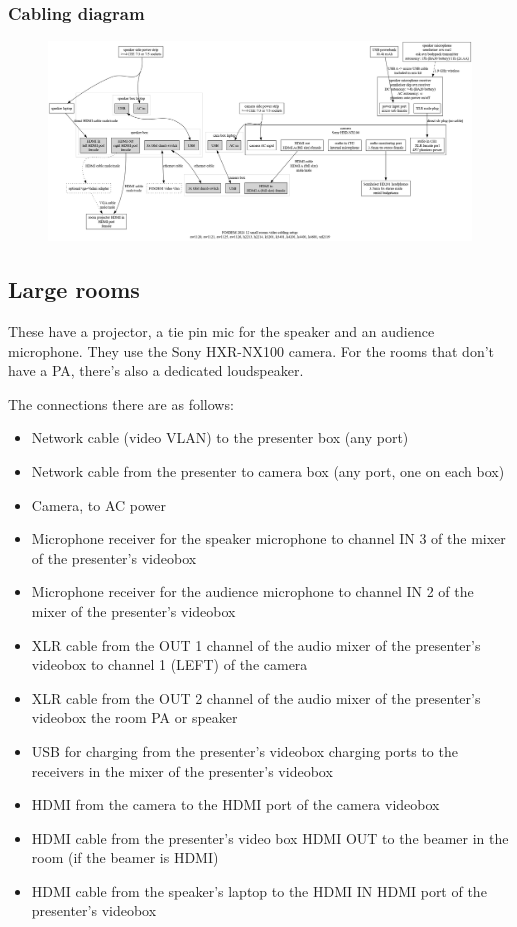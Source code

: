 \documentclass{article}
\begin{document}
\subsubsection{Cabling diagram}
\begin{figure}[H]
  \begin{sideways}
  \centering
  \includegraphics[width = 200mm]{../../graph/cabling_small_rooms.png}
  \end{sideways}
\end{figure}

\subsection{Large rooms}
These have a projector, a tie pin mic for the speaker and an audience microphone. They use the Sony HXR-NX100 camera. For the rooms that don't have a PA, there's also a dedicated loudspeaker.

The connections there are as follows:

\begin{itemize}
  \item Network cable (video VLAN) to the presenter box (any port)
  \item Network cable from the presenter to camera box (any port, one on each box)
  \item Camera, to AC power
  \item Microphone receiver for the speaker microphone to channel IN 3 of the mixer of the presenter's videobox
  \item Microphone receiver for the audience microphone to channel IN 2 of the mixer of the presenter's videobox
  \item XLR cable from the OUT 1 channel of the audio mixer of the presenter's videobox to channel 1 (LEFT) of the camera
  \item XLR cable from the OUT 2 channel of the audio mixer of the presenter's videobox the room PA or speaker
  \item USB for charging from the presenter's videobox charging ports to the receivers in the mixer of the presenter's videobox
  \item HDMI from the camera to the HDMI port of the camera videobox
  \item HDMI cable from the presenter's video box HDMI OUT to the beamer in the room (if the beamer is HDMI)
  \item HDMI cable from the speaker's laptop to the HDMI IN HDMI port of the presenter's videobox
\end{itemize}
\end{document}
